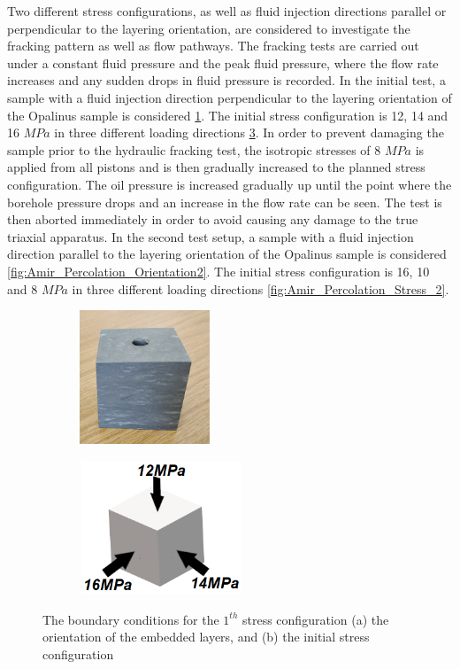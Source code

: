 Two different stress configurations, as well as fluid injection directions parallel or perpendicular to the layering orientation, are considered to investigate the fracking pattern as well as flow pathways. The fracking tests are carried out under a constant fluid pressure and the peak fluid pressure, where the flow rate increases and any sudden drops in fluid pressure is recorded. In the initial test, a sample with a fluid injection direction perpendicular to the layering orientation of the Opalinus sample is considered \ref{fig:Amir_Percolation_Orientation1}. The initial stress configuration is 12, 14 and 16 $MPa$ in three different loading directions \ref{fig:Amir_Percolation_Stress_1}. In order to prevent damaging the sample prior to the hydraulic fracking test, the isotropic stresses of 8 $MPa$ is applied from all pistons and is then gradually increased to the planned stress configuration. The oil pressure is increased gradually up until the point where the borehole pressure drops and an increase in the flow rate can be seen. The test is then aborted immediately in order to avoid causing any damage to the true triaxial apparatus. In the second test setup, a sample with a fluid injection direction parallel to the layering orientation of the Opalinus sample is considered \ref{fig:Amir_Percolation_Orientation2}. The initial stress configuration is 16, 10 and 8 $MPa$ in three different loading directions \ref{fig:Amir_Percolation_Stress_2}.


\begin{figure}[!ht]
\begin{subfigure}[c]{0.48\textwidth}
\includegraphics[width=4cm,height=4cm]{figures/Amir_Percolation_Orientation1.png}
\subcaption{}
\label{fig:Amir_Percolation_Orientation1}
\end{subfigure}
\hfill
\begin{subfigure}[c]{0.48\textwidth}
\includegraphics[width=5cm,height=4cm]{figures/Amir_Percolation_Stress_1.png}
\subcaption{}
\label{fig:Amir_Percolation_Stress_1}
\end{subfigure}
\caption{The boundary conditions for the $1^{th}$ stress configuration (a) the orientation of the embedded layers, and (b) the initial stress configuration}
\end{figure}

